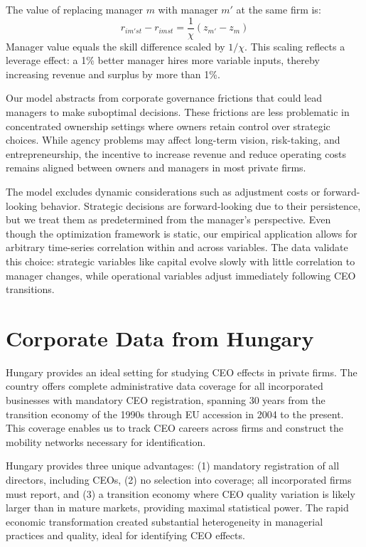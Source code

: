 \documentclass[11pt,a4paper]{article}
\begin{document}
The value of replacing manager $m$ with manager $m'$ at the same firm is:
\begin{equation}\label{eq:manager_value}
r_{im'st} - r_{imst} = \frac{1}{\chi}(z_{m'} - z_{m})
\end{equation}
Manager value equals the skill difference scaled by $1/\chi$. This scaling reflects a leverage effect: a 1\% better manager hires more variable inputs, thereby increasing revenue and surplus by more than 1\%.

Our model abstracts from corporate governance frictions that could lead managers to make suboptimal decisions. These frictions are less problematic in concentrated ownership settings where owners retain control over strategic choices. While agency problems may affect long-term vision, risk-taking, and entrepreneurship, the incentive to increase revenue and reduce operating costs remains aligned between owners and managers in most private firms.

The model excludes dynamic considerations such as adjustment costs or forward-looking behavior. Strategic decisions are forward-looking due to their persistence, but we treat them as predetermined from the manager's perspective. Even though the optimization framework is static, our empirical application allows for arbitrary time-series correlation within and across variables. The data validate this choice: strategic variables like capital evolve slowly with little correlation to manager changes, while operational variables adjust immediately following CEO transitions.

\section{Corporate Data from Hungary}

Hungary provides an ideal setting for studying CEO effects in private firms. The country offers complete administrative data coverage for all incorporated businesses with mandatory CEO registration, spanning 30 years from the transition economy of the 1990s through EU accession in 2004 to the present. This coverage enables us to track CEO careers across firms and construct the mobility networks necessary for identification.

Hungary provides three unique advantages: (1) mandatory registration of all directors, including CEOs, (2) no selection into coverage; all incorporated firms must report, and (3) a transition economy where CEO quality variation is likely larger than in mature markets, providing maximal statistical power. The rapid economic transformation created substantial heterogeneity in managerial practices and quality, ideal for identifying CEO effects.
\end{document}
